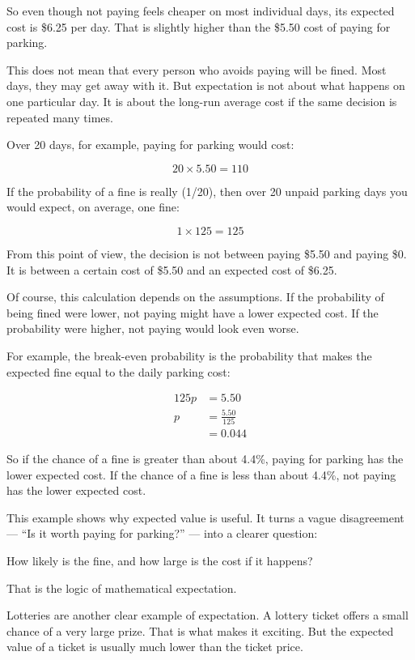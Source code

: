 \documentclass[
  letterpaper,
  DIV=11,
  numbers=noendperiod]{scrreprt}
\begin{document}
\begin{tcolorbox}
So even though not paying feels cheaper on most individual days, its
expected cost is \$6.25 per day. That is slightly higher than the \$5.50
cost of paying for parking.

This does not mean that every person who avoids paying will be fined.
Most days, they may get away with it. But expectation is not about what
happens on one particular day. It is about the long-run average cost if
the same decision is repeated many times.

Over 20 days, for example, paying for parking would cost:

\[
20 \times 5.50 = 110
\]

If the probability of a fine is really (1/20), then over 20 unpaid
parking days you would expect, on average, one fine:

\[
1 \times 125 = 125
\]

From this point of view, the decision is not between paying \$5.50 and
paying \$0. It is between a certain cost of \$5.50 and an expected cost
of \$6.25.

Of course, this calculation depends on the assumptions. If the
probability of being fined were lower, not paying might have a lower
expected cost. If the probability were higher, not paying would look
even worse.

For example, the break-even probability is the probability that makes
the expected fine equal to the daily parking cost:

\[
\begin{aligned}
125p &= 5.50 \\
p &= \frac{5.50}{125} \\
&= 0.044
\end{aligned}
\]

So if the chance of a fine is greater than about 4.4\%, paying for
parking has the lower expected cost. If the chance of a fine is less
than about 4.4\%, not paying has the lower expected cost.

This example shows why expected value is useful. It turns a vague
disagreement --- ``Is it worth paying for parking?'' --- into a clearer
question:

How likely is the fine, and how large is the cost if it happens?

That is the logic of mathematical expectation.

\end{tcolorbox}

Lotteries are another clear example of expectation. A lottery ticket
offers a small chance of a very large prize. That is what makes it
exciting. But the expected value of a ticket is usually much lower than
the ticket price.
\end{document}

